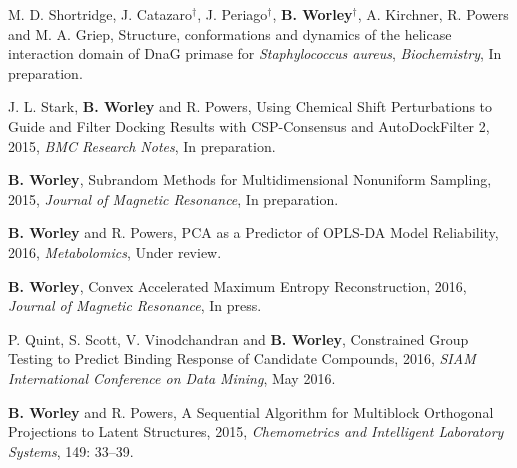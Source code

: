 \documentclass[letterpaper]{article}
\renewenvironment{itemize}{
  \begin{list}{}{
    \setlength{\leftmargin}{1.5em}
  }
}{
  \end{list}
}
\begin{document}
\begin{itemize}
\item M. D. Shortridge, J. Catazaro$^\dagger$, J. Periago$^\dagger$,
 \textbf{B. Worley}$^\dagger$, A. Kirchner, R. Powers and M. A. Griep,
 Structure, conformations and dynamics of the helicase interaction
 domain of DnaG primase for {\it Staphylococcus aureus},
 {\it Biochemistry}, In preparation.
\end{itemize}

\begin{itemize}
\item J. L. Stark, \textbf{B. Worley} and R. Powers,
 Using Chemical Shift Perturbations to Guide and Filter Docking Results
 with CSP-Consensus and AutoDockFilter 2, 2015,
 {\it BMC Research Notes}, In preparation.
\end{itemize}

\begin{itemize}
\item \textbf{B. Worley},
 Subrandom Methods for Multidimensional Nonuniform Sampling, 2015,
 {\it Journal of Magnetic Resonance}, In preparation.
\end{itemize}

\begin{itemize}
\item \textbf{B. Worley} and R. Powers,
 PCA as a Predictor of OPLS-DA Model Reliability, 2016,
 {\it Metabolomics}, Under review.
\end{itemize}

\begin{itemize}
\item \textbf{B. Worley},
 Convex Accelerated Maximum Entropy Reconstruction, 2016,
 {\it Journal of Magnetic Resonance}, In press.
\end{itemize}

\begin{itemize}
\item P. Quint, S. Scott, V. Vinodchandran and \textbf{B. Worley},
 Constrained Group Testing to Predict Binding
 Response of Candidate Compounds, 2016,
 {\it SIAM International Conference on Data Mining}, May 2016.
\end{itemize}

\begin{itemize}
\item \textbf{B. Worley} and R. Powers,
 A Sequential Algorithm for Multiblock Orthogonal
 Projections to Latent Structures, 2015,
 {\it Chemometrics and Intelligent Laboratory Systems}, 149: 33--39.
\end{itemize}
\end{document}

